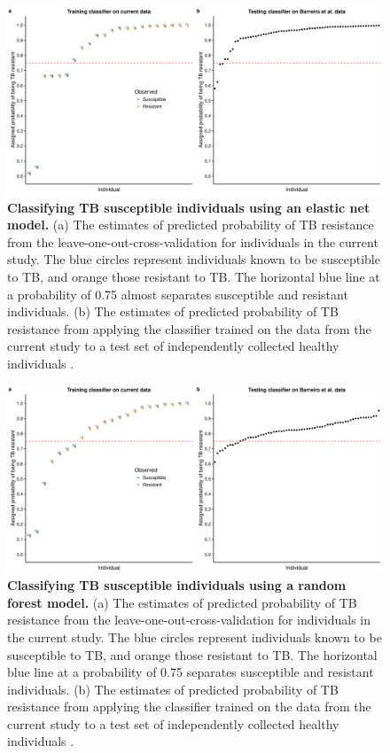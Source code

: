 \begin{figure}[ht]
\centering
\includegraphics[width=5in]{img/ch03/classifier-en.pdf}
\caption[Classifying TB susceptible individuals using an elastic net model.]{
\textbf{Classifying TB susceptible individuals using an elastic net model.} (a)
The estimates of predicted probability of TB resistance from the
leave-one-out-cross-validation for individuals in the current study.
The blue circles represent individuals known to be susceptible to TB,
and orange those resistant to TB. The horizontal blue line at a
probability of 0.75 almost separates susceptible and resistant
individuals. (b) The estimates of predicted probability of TB
resistance from applying the classifier trained on the data from the
current study to a test set of independently collected healthy
individuals \citep{Barreiro2012}.
}
\label{fig:class-en}
\end{figure}

\begin{figure}[ht]
\centering
\includegraphics[width=5in]{img/ch03/classifier-rf.pdf}
\caption[Classifying TB susceptible individuals using a random forest model.]{
\textbf{Classifying TB susceptible individuals using a random forest model.}
(a) The estimates of predicted probability of TB resistance from the
leave-one-out-cross-validation for individuals in the current study.
The blue circles represent individuals known to be susceptible to TB,
and orange those resistant to TB. The horizontal blue line at a
probability of 0.75 separates susceptible and resistant individuals.
(b) The estimates of predicted probability of TB resistance from
applying the classifier trained on the data from the current study to
a test set of independently collected healthy individuals
\citep{Barreiro2012}.
}
\label{fig:class-rf}
\end{figure}

